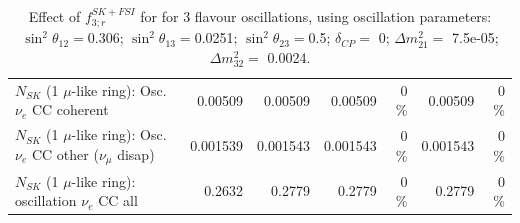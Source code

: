 \begin{table}
\begin{tabular}{| l | r | r | r  r | r  r |}
                          $N_{SK}$ (1 $\mu$-like ring): Osc. $\nu_e$ CC coherent &         0.00509 &         0.00509 &         0.00509 &        0 \%  &         0.00509 &        0 \%  \\ 
           $N_{SK}$ (1 $\mu$-like ring): Osc. $\nu_e$ CC other ($\nu_\mu$ disap) &        0.001539 &        0.001543 &        0.001543 &        0 \%  &        0.001543 &        0 \%  \\ 
                        $N_{SK}$ (1 $\mu$-like ring): oscillation $\nu_e$ CC all &          0.2632 &          0.2779 &          0.2779 &        0 \%  &          0.2779 &        0 \%  \\ 
\hline
\hline
\end{tabular}
\caption{ Effect of $f_{3; r}^{SK+FSI}$ for for 3 flavour oscillations, using oscillation parameters:  $\sin^2\theta_{12} = $0.306; $\sin^2\theta_{13} = $0.0251; $\sin^2\theta_{23} = $0.5; $\delta_{CP} = $        0; $\Delta m^2_{21} = $    7.5e-05; $\Delta m^2_{32} = $    0.0024. }
\label{tab:num_skdetfsi_003_1RmuT_3f_osc_t13:0.0251_spectralreco_spectraltrue}
\end{table}
\clearpage
